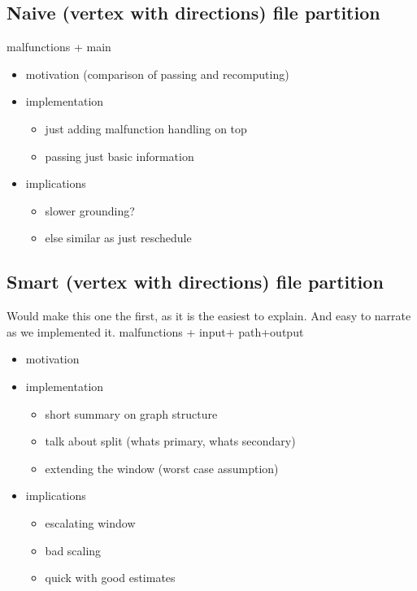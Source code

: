 \documentclass{llncs}
\begin{document}
\subsection{Naive (vertex with directions) file partition}
malfunctions + main
\color{blue}
\begin{itemize}
	\item motivation (comparison of passing and recomputing)
	\item implementation
	\begin{itemize}
		\item just adding malfunction handling on top
		\item passing just basic information
	\end{itemize}
	\item implications
	\begin{itemize}
		\item slower grounding?
		\item else similar as just reschedule
	\end{itemize}
\end{itemize}
\color{black}


\subsection{Smart (vertex with directions) file partition}
\color{green} Would make this one the first, as it is the easiest to explain. And easy to narrate as we implemented it. \color{black}
malfunctions + input+ path+output
\color{blue}
\begin{itemize}
	\item motivation
	\item implementation
	\begin{itemize}
		\item short summary on graph structure
		\item talk about split (whats primary, whats secondary)
		\item extending the window (worst case assumption)
	\end{itemize}
	\item implications
	\begin{itemize}
		\item escalating window
		\item bad scaling
		\item quick with good estimates
	\end{itemize}
\end{itemize}
\color{black}
\end{document}
